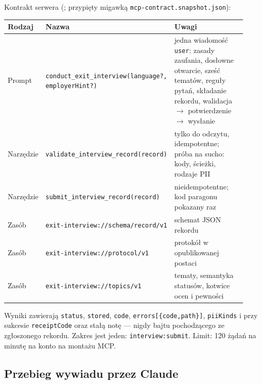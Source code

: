 {Kontrakt serwera (; przypięty migawką
\texttt{mcp-\allowbreak{}contract.\allowbreak{}snapshot.\allowbreak{}json}):

\begin{center}
\small
\begin{longtable}{@{}>{\raggedright\arraybackslash}p{0.12\linewidth}>{\raggedright\arraybackslash}p{0.38\linewidth}>{\raggedright\arraybackslash}p{0.42\linewidth}@{}}
\toprule
Rodzaj & Nazwa & Uwagi \\
\midrule
\endhead
Prompt & \texttt{conduct\_\allowbreak{}exit\_\allowbreak{}interview(language?, employerHint?)} & jedna wiadomość \texttt{user}: zasady zaufania, dosłowne otwarcie, sześć tematów, reguły pytań, składanie rekordu, walidacja $\rightarrow$ potwierdzenie $\rightarrow$ wysłanie \\
Narzędzie & \texttt{validate\_\allowbreak{}interview\_\allowbreak{}record(record)} & tylko do odczytu, idempotentne; próba na sucho: kody, ścieżki, rodzaje PII \\
Narzędzie & \texttt{submit\_\allowbreak{}interview\_\allowbreak{}record(record)} & nieidempotentne; kod paragonu pokazany raz \\
Zasób & \texttt{exit-\allowbreak{}interview:\allowbreak{}/\allowbreak{}/\allowbreak{}schema/\allowbreak{}record/\allowbreak{}v1} & schemat JSON rekordu \\
Zasób & \texttt{exit-\allowbreak{}interview:\allowbreak{}/\allowbreak{}/\allowbreak{}protocol/\allowbreak{}v1} & protokół w opublikowanej postaci \\
Zasób & \texttt{exit-\allowbreak{}interview:\allowbreak{}/\allowbreak{}/\allowbreak{}topics/\allowbreak{}v1} & tematy, semantyka statusów, kotwice ocen i pewności \\
\bottomrule
\end{longtable}
\end{center}

Wyniki zawierają \texttt{status}, \texttt{stored}, \texttt{code},
\texttt{errors[\{code,path\}]}, \texttt{piiKinds} i przy sukcesie
\texttt{receiptCode} oraz stałą notę --- nigdy bajtu pochodzącego ze
zgłoszonego rekordu. Zakres jest jeden: \texttt{interview:\allowbreak{}submit}. Limit:
120 żądań na minutę na konto na montażu MCP.

\subsection{Przebieg wywiadu przez Claude}

}
